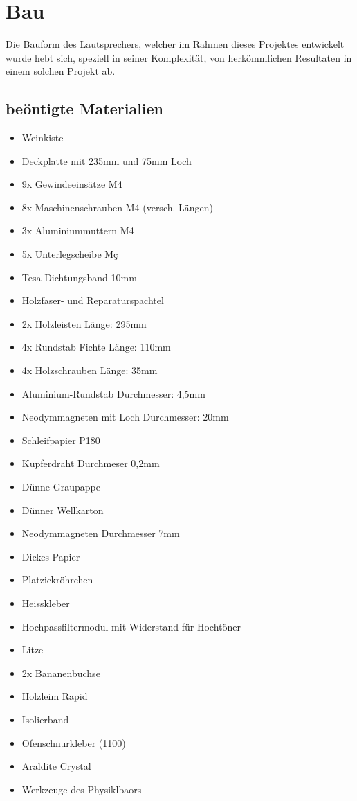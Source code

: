 \documentclass[a4paper,11pt]{report}
\begin{document}
\chapter{Bau}
Die Bauform des Lautsprechers, welcher im Rahmen dieses Projektes entwickelt wurde hebt sich, speziell in seiner Komplexität, von herkömmlichen Resultaten in einem solchen Projekt ab. 
\section{beöntigte Materialien}
\begin{multicols}{2}
    \begin{itemize}[parsep=0pt]
        \item Weinkiste
        \item Deckplatte mit 235mm und 75mm Loch
        \item 9x Gewindeeinsätze M4
        \item 8x Maschinenschrauben M4 (versch. Längen)
        \item 3x Aluminiummuttern M4
        \item 5x Unterlegscheibe Mç
        \item Tesa Dichtungsband 10mm
        \item Holzfaser- und Reparaturspachtel
        \item 2x Holzleisten Länge: 295mm
        \item 4x Rundstab Fichte Länge: 110mm
        \item 4x Holzschrauben Länge: 35mm
        \item Aluminium-Rundstab Durchmesser: 4,5mm
        \item Neodymmagneten mit Loch Durchmesser: 20mm
        \item Schleifpapier P180
        \item Kupferdraht Durchmeser 0,2mm
        \item Dünne Graupappe
        \item Dünner Wellkarton
        \item Neodymmagneten Durchmesser 7mm
        \item Dickes Papier
        \item Platzickröhrchen
        \item Heisskleber
        \item Hochpassfiltermodul mit Widerstand für Hochtöner
        \item Litze
        \item 2x Bananenbuchse
        \item Holzleim Rapid
        \item Isolierband
        \item Ofenschnurkleber (1100\textdegree)
        \item Araldite Crystal
        \item Werkzeuge des Physiklbaors
    \end{itemize}
\end{multicols}
\end{document}
